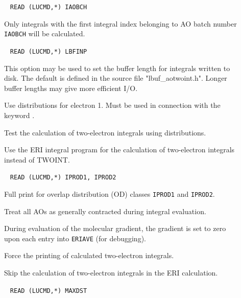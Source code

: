 \begin{description}
\item[]\verb| |\newline
\verb|READ (LUCMD,*) IAOBCH| 

Only integrals with the first integral index belonging to AO batch
number \verb|IAOBCH| will be calculated.

\item[]\verb| |\newline
\verb|READ (LUCMD,*) LBFINP|

This option may be used to set the buffer length for integrals written
to disk. The default is defined in the source file "lbuf\_aotwoint.h".
Longer buffer lengths may give more efficient I/O.

\item[] Use distributions for electron 1. Must be used in
  connection with the keyword .

\item[] Test the calculation of two-electron integrals
  using distributions.

\item[] Use the ERI integral program for the calculation
  of two-electron integrals instead of TWOINT.

\item[]\verb| |\newline
\verb|READ (LUCMD,*) IPROD1, IPROD2|

Full print for overlap distribution (OD) classes \verb|IPROD1| and \verb|IPROD2|.

\item[] Treat all AOs as generally contracted during
integral evaluation.

\item[] During evaluation of the molecular gradient, the
gradient is set to zero upon each entry into \verb|ERIAVE| (for
debugging).

\item[] Force the printing of calculated two-electron integrals.

\item[] Skip the calculation of two-electron integrals in
  the ERI calculation.

\item[]\verb| |\newline
\verb|READ (LUCMD,*) MAXDST|  


\end{description}
